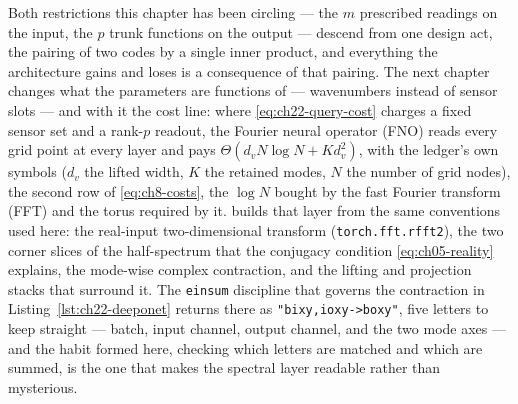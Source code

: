 \bigskip
\noindent Both restrictions this chapter has been circling --- the $m$ prescribed readings on
the input, the $p$ trunk functions on the output --- descend from one design act, the pairing of
two codes by a single inner product, and everything the architecture gains and loses is a
consequence of that pairing. The next
chapter changes what the parameters are functions of --- wavenumbers instead of sensor
slots --- and with it the cost line: where \eqref{eq:ch22-query-cost} charges a fixed sensor set
and a rank-$p$ readout, the Fourier neural operator (FNO) \cite{li2021fourier} reads every grid
point at every layer and pays $\Theta(d_v N \log N + K d_v^{2})$, with the ledger's own symbols
($d_v$ the lifted width, $K$ the retained modes, $N$ the number of grid nodes), the second row
of \eqref{eq:ch8-costs}, the $\log N$ bought by the fast Fourier transform (FFT) and the torus
required by it.  builds that
layer from the same conventions used here: the real-input two-dimensional transform
(\texttt{torch.fft.rfft2}), the two corner slices of the half-spectrum that the conjugacy
condition \eqref{eq:ch05-reality} explains, the mode-wise complex contraction, and the lifting
and projection stacks that surround it. The \texttt{einsum} discipline that governs the
contraction in Listing~\ref{lst:ch22-deeponet} returns there as \texttt{"bixy,ioxy->boxy"},
five letters to keep straight --- batch, input channel, output channel, and the two mode
axes --- and the habit formed here, checking which letters are matched and which are summed, is
the one that makes the spectral layer readable rather than mysterious.
